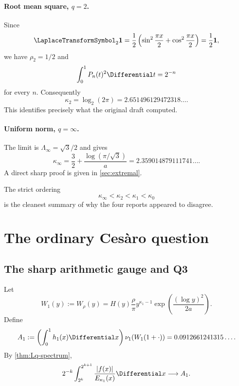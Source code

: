 \documentclass[11pt,oneside]{article}
\theoremstyle{definition}
\theoremstyle{remark}
\begin{document}
\paragraph{Root mean square, $q=2$.}
Since
\begin{equation}
 \LaplaceTransformSymbol_2\mathbf1
 =\frac12\left(\sin^2\frac{\pi x}{2}
 +\cos^2\frac{\pi x}{2}\right)=\frac12\mathbf1,
 \label{eq:L2-one}
\end{equation}
we have $\rho_2=1/2$ and
\begin{equation}
 \int_0^1P_n(t)^2\Differential t=2^{-n}
 \label{eq:L2-exact}
\end{equation}
for every $n$.  Consequently
\begin{equation}
 \boxed{\kappa_2=\log_2(2\pi)=2.651496129472318\ldots .}
 \label{eq:kappa2}
\end{equation}
This identifies precisely what the original draft computed.

\paragraph{Uniform norm, $q=\infty$.}
The limit is
$\Lambda_\infty=\sqrt3/2$ and gives
\begin{equation}
 \boxed{
 \kappa_\infty
 =\frac32+\frac{\log(\pi/\sqrt3)}a
 =2.359014879111741\ldots .}
 \label{eq:kappa-infty}
\end{equation}
A direct sharp proof is given in \cref{sec:extremal}.

The strict ordering
\begin{equation}
 \kappa_\infty<\kappa_2<\kappa_1<\kappa_0
 \label{eq:kappa-order}
\end{equation}
is the cleanest summary of why the four reports appeared to disagree.

\section{The ordinary Ces\`aro question}
\label{sec:Cesaro}

\subsection{The sharp arithmetic gauge and Q3}

Let
\begin{equation}
 W_1(y):=W_\rho(y)
 =H(y)\frac{\rho}{\pi}
 y^{\kappa_1-1}
 \exp\!\left(\frac{(\log y)^2}{2a}\right).
 \label{eq:W1}
\end{equation}
Define
\begin{equation}
 A_1:=
 \left(\int_0^1h_1(x)\Differential x\right)
 \nu_1\!\left(W_1(1+\cdot)\right)
 =0.0912661241315\ldots .
 \label{eq:A1}
\end{equation}
By \cref{thm:Lq-spectrum},
\begin{equation}
 2^{-k}\int_{2^k}^{2^{k+1}}
 \frac{|f(x)|}{E_{\kappa_1}(x)}\Differential x
 \longrightarrow A_1.
 \label{eq:L1-shell-limit}
\end{equation}
\end{document}
